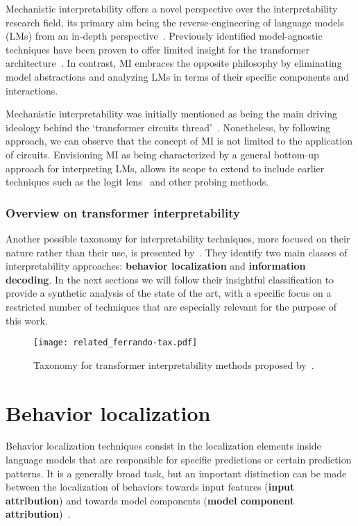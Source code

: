 Mechanistic interpretability offers a novel perspective over the interpretability research field, its primary aim being the reverse-engineering of language models (LMs) from an in-depth perspective~\cite{olah2022}.
Previously identified model-agnostic techniques have been proven to offer limited insight for the transformer architecture~\cite{neely2022,pruthi2022,bibal2022,krishna2024}.
In contrast, MI embraces the opposite philosophy by eliminating model abstractions and analyzing LMs in terms of their specific components and interactions.

Mechanistic interpretability was initially mentioned as being the main driving ideology behind the `transformer circuits thread'~\cite{elhage2021}.
Nonetheless, by following~\citet{rai2024} approach, we can observe that the concept of MI is not limited to the application of circuits.
Envisioning MI as being characterized by a general bottom-up approach for interpreting LMs, allows its scope to extend to include earlier techniques such as the logit lens~\cite{nostalgebraist2020} and other probing methods.

\subsubsection*{Overview on transformer interpretability}

Another possible taxonomy for interpretability techniques, more focused on their nature rather than their use, is presented by~\citet{ferrando2024}.
They identify two main classes of interpretability approaches: \textbf{behavior localization} and \textbf{information decoding}.
In the next sections we will follow their insightful classification to provide a synthetic analysis of the state of the art, with a specific focus on a restricted number of techniques that are especially relevant for the purpose of this work.

\begin{figure}[t!]
    \centering
    \texttt{[image: related\_ferrando-tax.pdf]}
    \caption{Taxonomy for transformer interpretability methods proposed by~\citet{ferrando2024}.}
    \label{fig:related_ferrando-tax}
\end{figure}

\section{Behavior localization}

Behavior localization techniques consist in the localization elements inside language models that are responsible for specific predictions or certain prediction patterns.
It is a generally broad task, but an important distinction can be made between the localization of behaviors towards input features (\textbf{input attribution}) and towards model components (\textbf{model component attribution})~\cite{ferrando2024}. 

